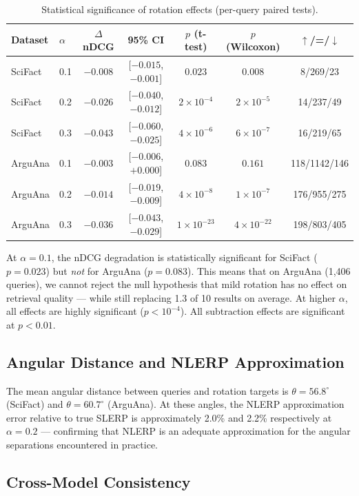 \documentclass{article}
\begin{document}
\begin{table}[ht]
\centering
\caption{Statistical significance of rotation effects (per-query paired tests).}
\label{tab:significance}
\small
\begin{tabular}{llccccc}
\toprule
Dataset & $\alpha$ & $\Delta$ nDCG & 95\% CI & $p$ (t-test) & $p$ (Wilcoxon) & $\uparrow$/=/$\downarrow$ \\
\midrule
SciFact & 0.1 & $-0.008$ & [$-0.015$, $-0.001$] & $0.023$ & $0.008$ & 8/269/23 \\
SciFact & 0.2 & $-0.026$ & [$-0.040$, $-0.012$] & $2 \times 10^{-4}$ & $2 \times 10^{-5}$ & 14/237/49 \\
SciFact & 0.3 & $-0.043$ & [$-0.060$, $-0.025$] & $4 \times 10^{-6}$ & $6 \times 10^{-7}$ & 16/219/65 \\
\addlinespace
ArguAna & 0.1 & $-0.003$ & [$-0.006$, $+0.000$] & $0.083$ & $0.161$ & 118/1142/146 \\
ArguAna & 0.2 & $-0.014$ & [$-0.019$, $-0.009$] & $4 \times 10^{-8}$ & $1 \times 10^{-7}$ & 176/955/275 \\
ArguAna & 0.3 & $-0.036$ & [$-0.043$, $-0.029$] & $1 \times 10^{-23}$ & $4 \times 10^{-22}$ & 198/803/405 \\
\bottomrule
\end{tabular}
\end{table}

At $\alpha = 0.1$, the nDCG degradation is statistically significant for SciFact ($p = 0.023$) but \emph{not} for ArguAna ($p = 0.083$). This means that on ArguAna (1,406 queries), we cannot reject the null hypothesis that mild rotation has no effect on retrieval quality --- while still replacing 1.3 of 10 results on average. At higher $\alpha$, all effects are highly significant ($p < 10^{-4}$). All subtraction effects are significant at $p < 0.01$.

\subsection{Angular Distance and NLERP Approximation}

The mean angular distance between queries and rotation targets is $\theta = 56.8^{\circ}$ (SciFact) and $\theta = 60.7^{\circ}$ (ArguAna). At these angles, the NLERP approximation error relative to true SLERP is approximately 2.0\% and 2.2\% respectively at $\alpha = 0.2$ --- confirming that NLERP is an adequate approximation for the angular separations encountered in practice.

\subsection{Cross-Model Consistency}
\end{document}

